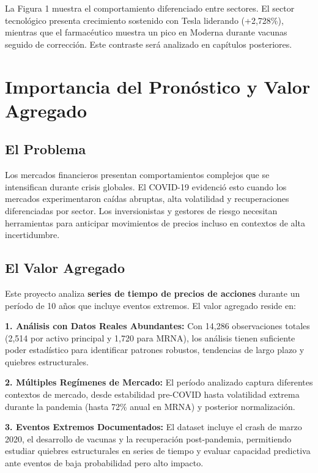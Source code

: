 \documentclass[
]{book}
\begin{document}
La Figura 1 muestra el comportamiento diferenciado entre sectores. El sector tecnológico presenta crecimiento sostenido con Tesla liderando (+2,728\%), mientras que el farmacéutico muestra un pico en Moderna durante vacunas seguido de corrección. Este contraste será analizado en capítulos posteriores.

\section{Importancia del Pronóstico y Valor Agregado}\label{importancia-del-pronuxf3stico-y-valor-agregado}

\subsection{El Problema}\label{el-problema}

Los mercados financieros presentan comportamientos complejos que se intensifican durante crisis globales. El COVID-19 evidenció esto cuando los mercados experimentaron caídas abruptas, alta volatilidad y recuperaciones diferenciadas por sector. Los inversionistas y gestores de riesgo necesitan herramientas para anticipar movimientos de precios incluso en contextos de alta incertidumbre.

\subsection{El Valor Agregado}\label{el-valor-agregado}

Este proyecto analiza \textbf{series de tiempo de precios de acciones} durante un período de 10 años que incluye eventos extremos. El valor agregado reside en:

\textbf{1. Análisis con Datos Reales Abundantes:} Con 14,286 observaciones totales (2,514 por activo principal y 1,720 para MRNA), los análisis tienen suficiente poder estadístico para identificar patrones robustos, tendencias de largo plazo y quiebres estructurales.

\textbf{2. Múltiples Regímenes de Mercado:} El período analizado captura diferentes contextos de mercado, desde estabilidad pre-COVID hasta volatilidad extrema durante la pandemia (hasta 72\% anual en MRNA) y posterior normalización.

\textbf{3. Eventos Extremos Documentados:} El dataset incluye el crash de marzo 2020, el desarrollo de vacunas y la recuperación post-pandemia, permitiendo estudiar quiebres estructurales en series de tiempo y evaluar capacidad predictiva ante eventos de baja probabilidad pero alto impacto.
\end{document}
